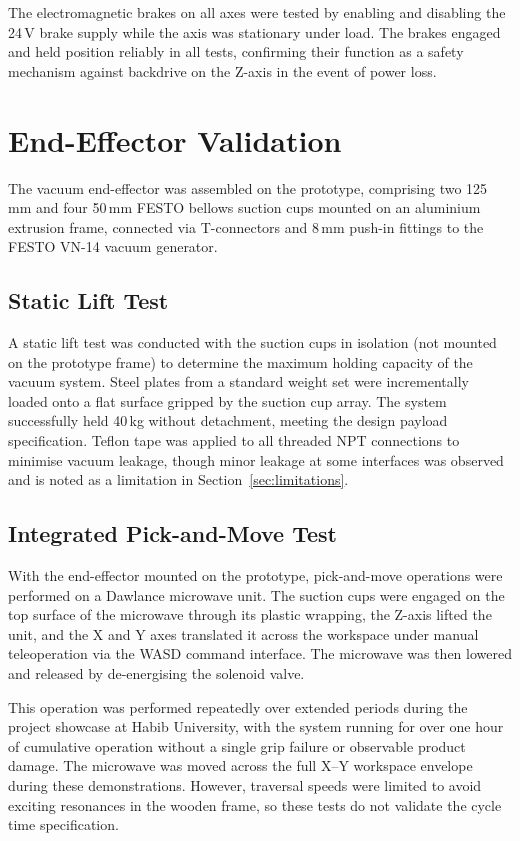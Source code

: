 The electromagnetic brakes on all axes were tested by enabling and disabling the 24\,V brake supply while the axis was stationary under load. The brakes engaged and held position reliably in all tests, confirming their function as a safety mechanism against backdrive on the Z-axis in the event of power loss.


\section{End-Effector Validation}

The vacuum end-effector was assembled on the prototype, comprising two 125\,mm and four 50\,mm FESTO bellows suction cups mounted on an aluminium extrusion frame, connected via T-connectors and 8\,mm push-in fittings to the FESTO VN-14 vacuum generator.

\subsection{Static Lift Test}

A static lift test was conducted with the suction cups in isolation (not mounted on the prototype frame) to determine the maximum holding capacity of the vacuum system. Steel plates from a standard weight set were incrementally loaded onto a flat surface gripped by the suction cup array. The system successfully held 40\,kg without detachment, meeting the design payload specification. Teflon tape was applied to all threaded NPT connections to minimise vacuum leakage, though minor leakage at some interfaces was observed and is noted as a limitation in Section~\ref{sec:limitations}.

\subsection{Integrated Pick-and-Move Test}

With the end-effector mounted on the prototype, pick-and-move operations were performed on a Dawlance microwave unit. The suction cups were engaged on the top surface of the microwave through its plastic wrapping, the Z-axis lifted the unit, and the X and Y axes translated it across the workspace under manual teleoperation via the WASD command interface. The microwave was then lowered and released by de-energising the solenoid valve.

This operation was performed repeatedly over extended periods during the project showcase at Habib University, with the system running for over one hour of cumulative operation without a single grip failure or observable product damage. The microwave was moved across the full X--Y workspace envelope during these demonstrations. However, traversal speeds were limited to avoid exciting resonances in the wooden frame, so these tests do not validate the cycle time specification.

